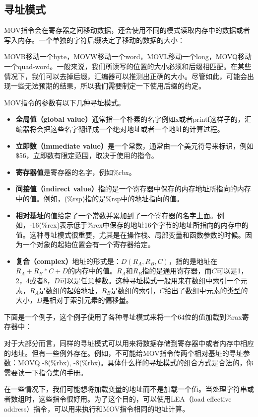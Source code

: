 \documentclass[cn,11pt,chinese]{elegantbook}
\begin{document}
\subsection{寻址模式}

MOV指令会在寄存器之间移动数据，还会使用不同的模式读取内存中的数据或者写入内存。一个单独的字符后缀决定了移动的数据的大小：

MOVB移动一个byte，MOVW移动一个word，MOVL移动一个long，MOVQ移动一个quad-word。一般来说，我们所读写的位置的大小必须和后缀相匹配。在某些情况下，我们可以去掉后缀，汇编器可以推测出正确的大小。尽管如此，可能会出现一些无法预期的结果，所以我们需要制定一下使用后缀的约定。

MOV指令的参数有以下几种寻址模式。

\begin{itemize}
  \item \textbf{全局值（global value）}通常指一个朴素的名字例如x或者printf这样子的，汇编器将会把这些名字翻译成一个绝对地址或者一个地址的计算过程。
  \item \textbf{立即数（immediate value）}是一个常数，通常由一个美元符号来标识，例如\$56，立即数有限定范围，取决于使用的指令。
  \item \textbf{寄存器值}是寄存器的名字，例如\%rbx。
  \item \textbf{间接值（indirect value）}指的是一个寄存器中保存的内存地址所指向的内存中的值。例如，(\%rsp)指的是\%rsp中的地址指向的值。
  \item \textbf{相对基址}的值给定了一个常数并累加到了一个寄存器的名字上面。例如，-16(\%rcx)表示低于\%rcx中保存的地址16个字节的地址所指向的内存中的值。这种寻址模式很重要，尤其是在操作栈、局部变量和函数参数的时候。因为一个对象的起始位置会有一个寄存器给定。
  \item \textbf{复合（complex）}地址的形式是：$D(R_A,R_B,C)$，指的是地址在$R_A+R_B*C+D$的内存中的值。$R_A$和$R_B$指的是通用寄存器，而$C$可以是1，2，4或者8，$D$可以是任意整数。这种寻址模式一般用来在数组中索引一个元素，$R_A$是数组的起始地址，$R_B$是数组的索引，$C$给出了数组中元素的类型的大小，$D$是相对于索引元素的偏移量。
\end{itemize}

下面是一个例子，这个例子使用了各种寻址模式来将一个64位的值加载到\%rax寄存器中：

对于大部分而言，同样的寻址模式可以用来将数据存储到寄存器中或者内存中相应的地址。但有一些例外存在。例如，不可能给MOV指令传两个相对基址的寻址参数：MOVQ -8(\%rbx), -8(\%rbx)。具体什么样的寻址模式的组合方式是合法的，你需要读一下指令集的手册。

在一些情况下，我们可能想将加载变量的地址而不是加载一个值。当处理字符串或者数组时，这些指令很好用。为了这个目的，可以使用LEA（load effective address）指令，可以用来执行和MOV指令相同的地址计算。
\end{document}
